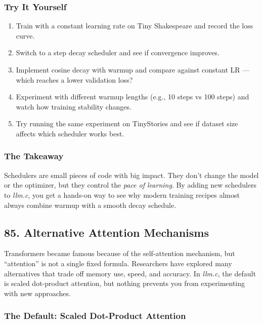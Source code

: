 \documentclass[
  letterpaper,
  DIV=11,
  numbers=noendperiod]{scrreprt}
\providecommand{\tightlist}{%
  \setlength{\itemsep}{0pt}\setlength{\parskip}{0pt}}
\begin{document}
\subsubsection{Try It Yourself}\label{try-it-yourself-72}

\begin{enumerate}
\def\labelenumi{\arabic{enumi}.}
\tightlist
\item
  Train with a constant learning rate on Tiny Shakespeare and record the
  loss curve.
\item
  Switch to a step decay scheduler and see if convergence improves.
\item
  Implement cosine decay with warmup and compare against constant LR ---
  which reaches a lower validation loss?
\item
  Experiment with different warmup lengths (e.g., 10 steps vs 100 steps)
  and watch how training stability changes.
\item
  Try running the same experiment on TinyStories and see if dataset size
  affects which scheduler works best.
\end{enumerate}

\subsubsection{The Takeaway}\label{the-takeaway-73}

Schedulers are small pieces of code with big impact. They don't change
the model or the optimizer, but they control the \emph{pace of
learning}. By adding new schedulers to \emph{llm.c}, you get a hands-on
way to see why modern training recipes almost always combine warmup with
a smooth decay schedule.

\subsection{85. Alternative Attention
Mechanisms}\label{alternative-attention-mechanisms}

Transformers became famous because of the self-attention mechanism, but
``attention'' is not a single fixed formula. Researchers have explored
many alternatives that trade off memory use, speed, and accuracy. In
\emph{llm.c}, the default is scaled dot-product attention, but nothing
prevents you from experimenting with new approaches.

\subsubsection{The Default: Scaled Dot-Product
Attention}\label{the-default-scaled-dot-product-attention}
\end{document}
